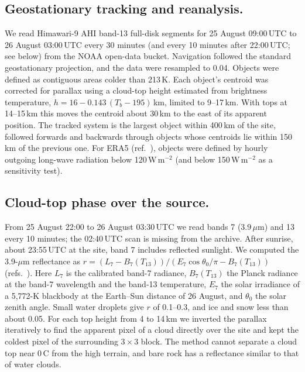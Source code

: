 \documentclass{nature}
\begin{document}
\begin{methods}
\subsection{Geostationary tracking and reanalysis.}
We read Himawari-9 AHI band-13 full-disk segments\cite{bessho2016} for 25 August 09:00\,UTC to 26 August 03:00\,UTC every 30 minutes (and every 10 minutes after 22:00\,UTC; see below) from the NOAA open-data bucket. Navigation followed the standard geostationary projection, and the data were resampled to 0.04\textdegree. Objects were defined as contiguous areas colder than 213\,K. Each object's centroid was corrected for parallax using a cloud-top height estimated from brightness temperature, $h=16-0.143\,(T_b-195)$\,km, limited to 9--17\,km. With tops at 14--15\,km this moves the centroid about 30\,km to the east of its apparent position. The tracked system is the largest object within 400\,km of the site, followed forwards and backwards through objects whose centroids lie within 150\,km of the previous one. For ERA5 (ref.~), objects were defined by hourly outgoing long-wave radiation below 120\,W\,m$^{-2}$ (and below 150\,W\,m$^{-2}$ as a sensitivity test).

\subsection{Cloud-top phase over the source.}
From 25 August 22:00 to 26 August 03:30\,UTC we read bands 7 (3.9\,$\mu$m) and 13 every 10 minutes; the 02:40\,UTC scan is missing from the archive. After sunrise, about 23:55\,UTC at the site, band 7 includes reflected sunlight. We computed the 3.9-$\mu$m reflectance as $r=(L_7-B_7(T_{13}))/(E_7\cos\theta_0/\pi-B_7(T_{13}))$ (refs.~). Here $L_7$ is the calibrated band-7 radiance, $B_7(T_{13})$ the Planck radiance at the band-7 wavelength and the band-13 temperature, $E_7$ the solar irradiance of a 5,772-K blackbody at the Earth--Sun distance of 26 August, and $\theta_0$ the solar zenith angle. Small water droplets give $r$ of 0.1--0.3, and ice and snow less than about 0.05. For each top height from 4 to 14\,km we inverted the parallax iteratively to find the apparent pixel of a cloud directly over the site and kept the coldest pixel of the surrounding 3\,$\times$\,3 block. The method cannot separate a cloud top near 0\,\textdegree C from the high terrain, and bare rock has a reflectance similar to that of water clouds.


\end{methods}
\end{document}

